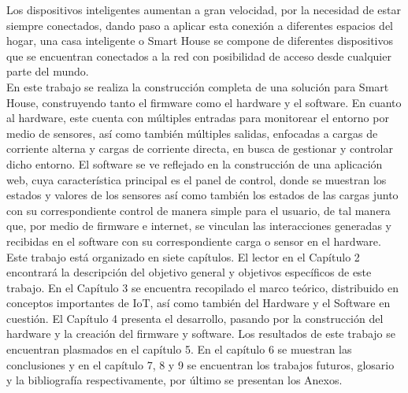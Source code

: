 Los dispositivos inteligentes aumentan a gran velocidad, por la necesidad de estar siempre conectados, dando paso a aplicar esta conexión a diferentes espacios del hogar, una casa inteligente o Smart House se compone de diferentes dispositivos que se encuentran conectados a la red con posibilidad de acceso desde cualquier parte del mundo. \\

En este trabajo se realiza la construcción completa de una solución para Smart House, construyendo tanto el firmware como el hardware y el software. En cuanto al hardware, este cuenta con múltiples entradas para monitorear el entorno por medio de sensores, así como también múltiples salidas, enfocadas a cargas de corriente alterna y cargas de corriente directa, en busca de gestionar y controlar dicho entorno. El software se ve reflejado en la construcción de una aplicación web, cuya característica principal es el panel de control, donde se muestran los estados y valores de los sensores así como también los estados de las cargas junto con su correspondiente control de manera simple para el usuario, de tal manera que, por medio de firmware e internet, se vinculan las interacciones generadas y recibidas en el software con su correspondiente carga o sensor en el hardware.\\

Este trabajo está organizado en siete capítulos. El lector en el Capítulo 2 encontrará la descripción del objetivo general y objetivos específicos de este trabajo. En el Capítulo 3 se encuentra recopilado el marco teórico, distribuido en conceptos importantes de IoT, así como también del Hardware y el Software en cuestión. El Capítulo 4 presenta el desarrollo, pasando por la construcción del hardware y la creación del firmware y software. Los resultados de este trabajo se encuentran plasmados en el capítulo 5. En el capítulo 6 se muestran las conclusiones y en el capítulo 7, 8 y 9 se encuentran los trabajos futuros, glosario y la bibliografía respectivamente, por último se presentan los Anexos.\\
